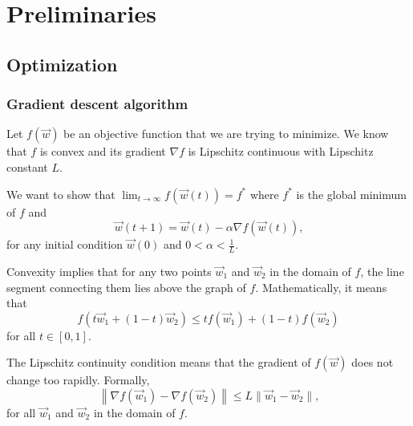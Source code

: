 \chapter{Preliminaries}


\section{Optimization}

\subsection{Gradient descent algorithm}

Let $f(\vec{w})$ be an objective function that we are trying to minimize.  We know that
$f$ is convex and its gradient $\nabla f$ is Lipschitz continuous with Lipschitz
constant $L$.

We want to show that $\lim_{t\rightarrow\infty} f(\vec{w}(t)) = f^{*}$ where $f^{*}$
is the global minimum of $f$ and $$\vec{w}(t+1) = \vec{w}(t) - \alpha \nabla f(\vec{w}(t))\mbox{,}$$
for any initial condition $\vec{w}(0)$ and $0 < \alpha < \frac{1}{L}$.

Convexity implies that for any two points $\vec{w}_1$ and $\vec{w}_2$ in the domain of
$f$, the line segment connecting them lies above the graph of $f$.  Mathematically, it
means that $$f(t\vec{w}_1 + (1 - t) \vec{w}_2) \leq t f(\vec{w}_1) + (1 - t)
f(\vec{w}_2)$$ for all $t \in [0, 1]$.

The Lipschitz continuity condition means that the gradient of $f(\vec{w})$ does not change too rapidly.
Formally, $$\left\|\nabla f(\vec{w}_1) - \nabla f(\vec{w}_2)\right\| \leq L \|\vec{w}_1 - \vec{w}_2\|\mbox{,}$$
for all $\vec{w}_1$ and $\vec{w}_2$ in the domain of $f$.
